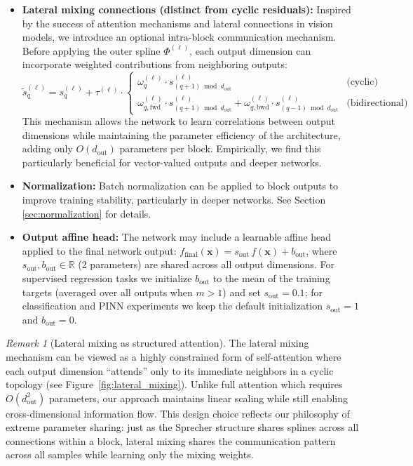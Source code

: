 \documentclass{article}
\theoremstyle{plain}
\theoremstyle{definition}
\theoremstyle{remark}
\newtheorem{remark}{Remark}
\begin{document}
\begin{itemize}
    \item \textbf{Lateral mixing connections (distinct from cyclic residuals):} Inspired by the success of attention mechanisms and lateral connections in vision models, we introduce an optional intra-block communication mechanism. Before applying the outer spline $\Phi^{(\ell)}$, each output dimension can incorporate weighted contributions from neighboring outputs:
    $$\tilde{s}_q^{(\ell)} = s_q^{(\ell)} + \tau^{(\ell)} \cdot \begin{cases}
    \omega_q^{(\ell)} \cdot s_{(q+1) \bmod d_{\mathrm{out}}}^{(\ell)} & \text{(cyclic)} \\
    \omega_{q,\text{fwd}}^{(\ell)} \cdot s_{(q+1) \bmod d_{\mathrm{out}}}^{(\ell)} + \omega_{q,\text{bwd}}^{(\ell)} \cdot s_{(q-1) \bmod d_{\mathrm{out}}}^{(\ell)} & \text{(bidirectional)}
    \end{cases}$$
    This mechanism allows the network to learn correlations between output dimensions while maintaining the parameter efficiency of the architecture, adding only $O(d_{\mathrm{out}})$ parameters per block. Empirically, we find this particularly beneficial for vector-valued outputs and deeper networks.
    
    \item \textbf{Normalization:} Batch normalization can be applied to block outputs to improve training stability, particularly in deeper networks. See Section \ref{sec:normalization} for details.
    
    \item \textbf{Output affine head:} The network may include a learnable affine head applied to the final network output: $f_{\text{final}}(\mathbf{x}) = s_{\text{out}}\, f(\mathbf{x}) + b_{\text{out}}$, where $s_{\text{out}}, b_{\text{out}}\in\mathbb{R}$ (2 parameters) are shared across all output dimensions. For supervised regression tasks we initialize $b_{\text{out}}$ to the mean of the training targets (averaged over all outputs when $m>1$) and set $s_{\text{out}}=0.1$; for classification and PINN experiments we keep the default initialization $s_{\text{out}}=1$ and $b_{\text{out}}=0$.

\end{itemize}

\begin{remark}[Lateral mixing as structured attention]
The lateral mixing mechanism can be viewed as a highly constrained form of self-attention where each output dimension ``attends'' only to its immediate neighbors in a cyclic topology (see Figure~\ref{fig:lateral_mixing}). Unlike full attention which requires $O(d_{\mathrm{out}}^2)$ parameters, our approach maintains linear scaling while still enabling cross-dimensional information flow. This design choice reflects our philosophy of extreme parameter sharing: just as the Sprecher structure shares splines across all connections within a block, lateral mixing shares the communication pattern across all samples while learning only the mixing weights.
\end{remark}
\end{document}
